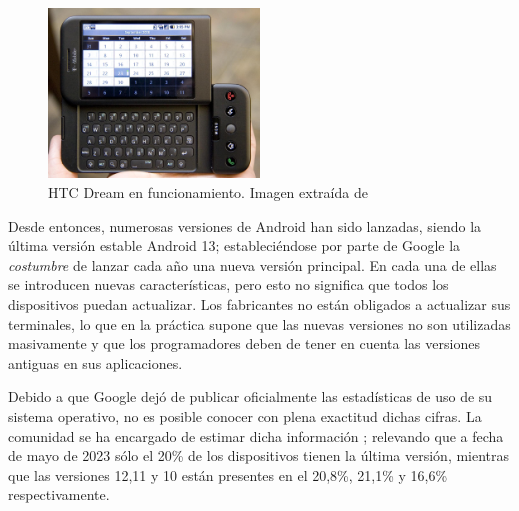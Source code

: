             \begin{figure}[h]
                \centering
                \includegraphics[width=0.5\textwidth]{figures/HTC Dream.jpg}
                \caption[HTC Dream en funcionamiento.]{HTC Dream en funcionamiento. Imagen extraída de \cite{oryl_t-mobile_2008}}
                \label{figure:android:htc_dream}
            \end{figure}

            Desde entonces, numerosas versiones de Android han sido lanzadas, siendo la última versión estable Android 
            13; estableciéndose por parte de Google la \textit{costumbre} de lanzar cada año una nueva versión principal. 
            En cada una de ellas se introducen nuevas características, pero esto no significa que todos los dispositivos 
            puedan actualizar. Los fabricantes no están obligados a actualizar sus terminales, lo que en la práctica 
            supone que las nuevas versiones no son utilizadas masivamente y que los programadores deben de tener en 
            cuenta las versiones antiguas en sus aplicaciones. 
            \newline

            Debido a que Google dejó de publicar oficialmente las estadísticas de uso de su sistema operativo, no es
            posible conocer con plena exactitud dichas cifras. La comunidad se ha encargado de estimar dicha 
            información \cite{belinski_android_nodate}; relevando que a fecha de mayo de 2023 sólo el 20\% de los 
            dispositivos tienen la última versión, mientras que las versiones 12,11 y 10 están presentes en el 
            20,8\%, 21,1\% y 16,6\% respectivamente. \newline

